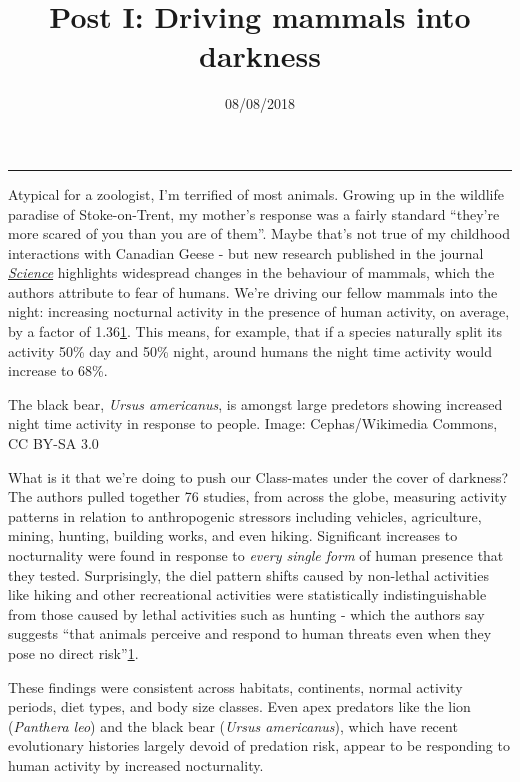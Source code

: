 \documentclass[]{article}
\title{Post I: Driving mammals into darkness}
\author{}
\date{08/08/2018}
\begin{document}
\maketitle

\begin{center}\rule{0.5\linewidth}{\linethickness}\end{center}

Atypical for a zoologist, I'm terrified of most animals. Growing up in
the wildlife paradise of Stoke-on-Trent, my mother's response was a
fairly standard ``they're more scared of you than you are of them''.
Maybe that's not true of my childhood interactions with Canadian Geese -
but new research published in the journal
\href{http://science.sciencemag.org/content/360/6394/1232}{\emph{Science}}
highlights widespread changes in the behaviour of mammals, which the
authors attribute to fear of humans. We're driving our fellow mammals
into the night: increasing nocturnal activity in the presence of human
activity, on average, by a factor of 1.36\protect\hyperlink{f1}{1}. This
means, for example, that if a species naturally split its activity 50\%
day and 50\% night, around humans the night time activity would increase
to 68\%.

The black bear, \emph{Ursus americanus}, is amongst large predetors
showing increased night time activity in response to people. Image:
Cephas/Wikimedia Commons, CC BY-SA 3.0

What is it that we're doing to push our Class-mates under the cover of
darkness? The authors pulled together 76 studies, from across the globe,
measuring activity patterns in relation to anthropogenic stressors
including vehicles, agriculture, mining, hunting, building works, and
even hiking. Significant increases to nocturnality were found in
response to \emph{every single form} of human presence that they tested.
Surprisingly, the diel pattern shifts caused by non-lethal activities
like hiking and other recreational activities were statistically
indistinguishable from those caused by lethal activities such as hunting
- which the authors say suggests ``that animals perceive and respond to
human threats even when they pose no direct
risk''\protect\hyperlink{f1}{1}.

These findings were consistent across habitats, continents, normal
activity periods, diet types, and body size classes. Even apex predators
like the lion (\emph{Panthera leo}) and the black bear (\emph{Ursus
americanus}), which have recent evolutionary histories largely devoid of
predation risk, appear to be responding to human activity by increased
nocturnality.
\end{document}
